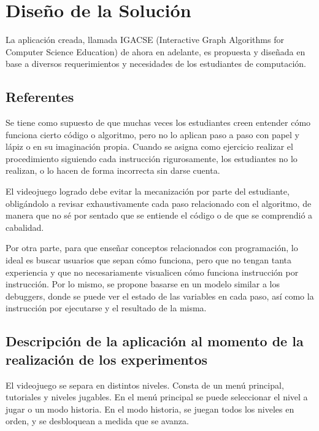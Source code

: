 \chapter{Diseño de la Solución}

La aplicación creada, llamada IGACSE (Interactive Graph Algorithms for Computer Science Education) de ahora en adelante, es 
propuesta y diseñada en base a diversos requerimientos y necesidades de los estudiantes de computación.

\section{Referentes}

Se tiene como supuesto de que muchas veces los estudiantes creen entender cómo funciona cierto código o algoritmo, pero no lo 
aplican paso a paso con papel y lápiz o en su imaginación propia. Cuando se asigna como ejercicio realizar el procedimiento 
siguiendo cada instrucción rigurosamente, los estudiantes no lo realizan, o lo hacen de forma incorrecta sin darse cuenta.

El videojuego logrado debe evitar la mecanización por parte del estudiante, obligándolo a revisar exhaustivamente cada paso
relacionado con el algoritmo, de manera que no sé por sentado que se entiende el código o de que se comprendió a cabalidad.

Por otra parte, para que enseñar conceptos relacionados con programación, lo ideal es buscar usuarios que sepan cómo funciona, pero
que no tengan tanta experiencia y que no necesariamente visualicen cómo funciona instrucción por instrucción. Por lo mismo, se 
propone basarse en un modelo similar a los debuggers, donde se puede ver el estado de las variables en cada paso, así como la 
instrucción por ejecutarse y el resultado de la misma.

\section{Descripción de la aplicación al momento de la realización de los experimentos}

El videojuego se separa en distintos niveles. Consta de un menú principal, tutoriales y niveles jugables. 
En el menú principal se puede seleccionar el nivel a jugar o un modo historia. En el modo historia, se juegan todos los 
niveles en orden, y se desbloquean a medida que se avanza.

